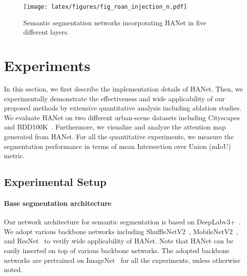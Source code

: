 \documentclass[10pt,twocolumn,letterpaper]{article}
\begin{document}
\begin{figure}[t]
\begin{center}
\texttt{[image: latex/figures/fig\_roan\_injection\_n.pdf]}
\end{center}
\vspace*{-0.7cm}
   \caption{Semantic segmentation networks incorporating HANet in five different layers.}
\label{fig:sem_arch}
\vspace*{-0.6cm}
\end{figure}




\vspace*{-0.2cm}
\section{Experiments}\label{sec:Exp}
\vspace*{-0.1cm}


In this section, we first describe the implementation details of HANet. Then, we experimentally demonstrate the effectiveness and wide applicability of our proposed methods by extensive quantitative analysis including ablation studies. We evaluate HANet on two different urban-scene datasets including Cityscapes~\cite{cordts2016cityscapes} and BDD100K~\cite{yu2018bdd100k}. Furthermore, we visualize and analyze the attention map generated from HANet. For all the quantitative experiments, we measure the segmentation performance in terms of mean Intersection over Union (mIoU) metric.
\vspace*{-0.2cm}
\subsection{Experimental Setup}
\vspace*{-0.1cm}
\paragraph{Base segmentation architecture}
Our network architecture for semantic segmentation is based on DeepLabv3+~\cite{chen2018encoder}. We adopt various backbone networks including ShuffleNetV2~\cite{ma2018shufflenet}, MobileNetV2~\cite{Sandler_2018}, and ResNet~\cite{he2016deep} to verify wide applicability of HANet. Note that HANet can be easily inserted on top of various backbone networks. The adopted backbone networks are pretrained on ImageNet~\cite{russakovsky2015imagenet} for all the experiments, unless otherwise noted.
\end{document}
